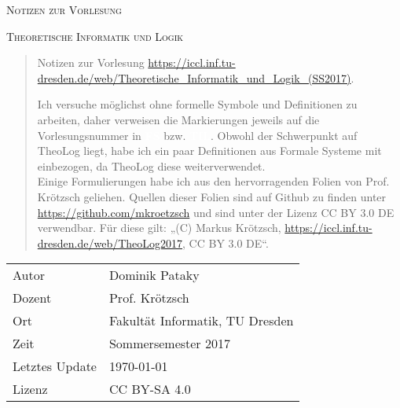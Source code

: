 \documentclass[a4paper,10pt]{article}
\newcommand{\vl}[1]{\colorbox{vl}{\textcolor{white}{\small\textbf{#1}}}}
\begin{document}
    \pagestyle{fancy}

    \rhead{\slshape\nouppercase{\leftmark}}
    \cfoot{\thepage}

    \begin{titlepage}
        \centering

        {\scshape\Large Notizen zur Vorlesung \par}
        {\scshape\LARGE Theoretische Informatik und Logik \par}
        \vspace{1cm}

        \begin{abstract}
            Notizen zur Vorlesung \url{https://iccl.inf.tu-dresden.de/web/Theoretische_Informatik_und_Logik_(SS2017)}. \par
            Ich versuche möglichst ohne formelle Symbole und Definitionen zu arbeiten, daher verweisen die Markierungen jeweils auf die Vorlesungsnummer in \vl{FS} bzw. \vl{TIL}.
            Obwohl der Schwerpunkt auf TheoLog liegt, habe ich ein paar Definitionen aus Formale Systeme mit einbezogen, da TheoLog diese weiterverwendet. \\
            Einige Formulierungen habe ich aus den hervorragenden Folien von Prof. Krötzsch geliehen. Quellen dieser Folien sind auf Github zu finden unter \url{https://github.com/mkroetzsch} und sind unter der Lizenz CC BY 3.0 DE verwendbar. Für diese gilt: „(C) Markus Krötzsch, \url{https://iccl.inf.tu-dresden.de/web/TheoLog2017}, CC BY 3.0 DE“.
        \end{abstract}

        \tableofcontents

        \vfill
        \begin{tabular}{p{3cm} p{10cm}}
            Autor & Dominik Pataky \\
            Dozent & Prof. Krötzsch \\
            Ort & Fakultät Informatik, TU Dresden \\
            Zeit & Sommersemester 2017 \\
            Letztes Update & \today \\
            Lizenz & CC BY-SA 4.0
        \end{tabular}

    \end{titlepage}
\end{document}
